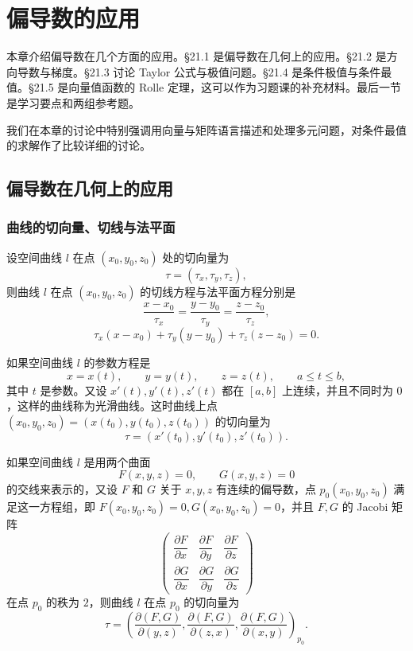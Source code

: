 \chapter{偏导数的应用}

本章介绍偏导数在几个方面的应用。§21.1 是偏导数在几何上的应用。§21.2 是方向导数与梯度。§21.3 讨论 Taylor 公式与极值问题。§21.4 是条件极值与条件最值。§21.5 是向量值函数的 Rolle 定理，这可以作为习题课的补充材料。最后一节是学习要点和两组参考题。

我们在本章的讨论中特别强调用向量与矩阵语言描述和处理多元问题，对条件最值的求解作了比较详细的讨论。

\section{偏导数在几何上的应用}

\subsection{曲线的切向量、切线与法平面}

设空间曲线 $l$ 在点 $(x_0,y_0,z_0)$ 处的切向量为
\[
  \tau=(\tau_x,\tau_y,\tau_z),
\]
则曲线 $l$ 在点 $(x_0,y_0,z_0)$ 的切线方程与法平面方程分别是
\[
  \frac{x-x_0}{\tau_x}=\frac{y-y_0}{\tau_y}=\frac{z-z_0}{\tau_z},
\]
\[
  \tau_x(x-x_0)+\tau_y(y-y_0)+\tau_z(z-z_0)=0.
\]

如果空间曲线 $l$ 的参数方程是
\[
  x=x(t),\qquad y=y(t),\qquad z=z(t),\qquad a\le t\le b,
\]
其中 $t$ 是参数。又设 $x'(t),y'(t),z'(t)$ 都在 $[a,b]$ 上连续，并且不同时为 $0$，这样的曲线称为光滑曲线。这时曲线上点 $(x_0,y_0,z_0)=(x(t_0),y(t_0),z(t_0))$ 的切向量为
\[
  \tau=(x'(t_0),y'(t_0),z'(t_0)).
\]

如果空间曲线 $l$ 是用两个曲面
\[
  F(x,y,z)=0,\qquad G(x,y,z)=0
\]
的交线来表示的，又设 $F$ 和 $G$ 关于 $x,y,z$ 有连续的偏导数，点 $p_0(x_0,y_0,z_0)$ 满足这一方程组，即 $F(x_0,y_0,z_0)=0,G(x_0,y_0,z_0)=0$，并且 $F,G$ 的 Jacobi 矩阵
\[
  \begin{pmatrix}
    \dfrac{\partial F}{\partial x} & \dfrac{\partial F}{\partial y} & \dfrac{\partial F}{\partial z}\\[4pt]
    \dfrac{\partial G}{\partial x} & \dfrac{\partial G}{\partial y} & \dfrac{\partial G}{\partial z}
  \end{pmatrix}
\]
在点 $p_0$ 的秩为 $2$，则曲线 $l$ 在点 $p_0$ 的切向量为
\[
  \tau=\left(
    \frac{\partial(F,G)}{\partial(y,z)},
    \frac{\partial(F,G)}{\partial(z,x)},
    \frac{\partial(F,G)}{\partial(x,y)}
  \right)_{p_0}.
\]

